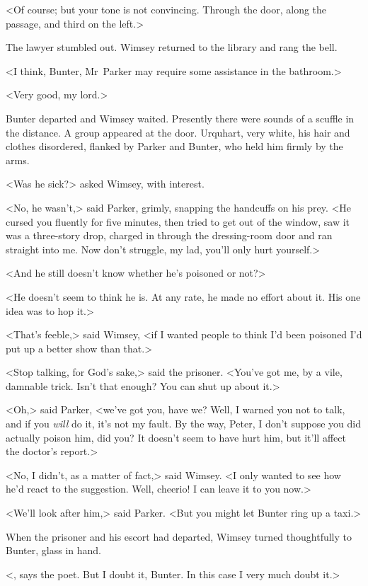 <Of course; but your tone is not convincing. Through the door, along the passage, and third on the left.>

The lawyer stumbled out. Wimsey returned to the library and rang the bell.

<I think, Bunter, Mr~Parker may require some assistance in the bathroom.>

<Very good, my lord.>

Bunter departed and Wimsey waited. Presently there were sounds of a scuffle in the distance. A group appeared at the door. Urquhart, very white, his hair and clothes disordered, flanked by Parker and Bunter, who held him firmly by the arms.

<Was he sick?> asked Wimsey, with interest.

<No, he wasn't,> said Parker, grimly, snapping the handcuffs on his prey. <He cursed you fluently for five minutes, then tried to get out of the window, saw it was a three-story drop, charged in through the dressing-room door and ran straight into me. Now don't struggle, my lad, you'll only hurt yourself.>

<And he still doesn't know whether he's poisoned or not?>

<He doesn't seem to think he is. At any rate, he made no effort about it. His one idea was to hop it.>

<That's feeble,> said Wimsey, <if I wanted people to think I'd been poisoned I'd put up a better show than that.>

<Stop talking, for God's sake,> said the prisoner. <You've got me, by a vile, damnable trick. Isn't that enough? You can shut up about it.>

<Oh,> said Parker, <we've got you, have we? Well, I warned you not to talk, and if you \emph{will} do it, it's not my fault. By the way, Peter, I don't suppose you did actually poison him, did you? It doesn't seem to have hurt him, but it'll affect the doctor's report.>

<No, I didn't, as a matter of fact,> said Wimsey. <I only wanted to see how he'd react to the suggestion. Well, cheerio! I can leave it to you now.>

<We'll look after him,> said Parker. <But you might let Bunter ring up a taxi.>

When the prisoner and his escort had departed, Wimsey turned thoughtfully to Bunter, glass in hand.

<, says the poet. But I doubt it, Bunter. In this case I very much doubt it.>